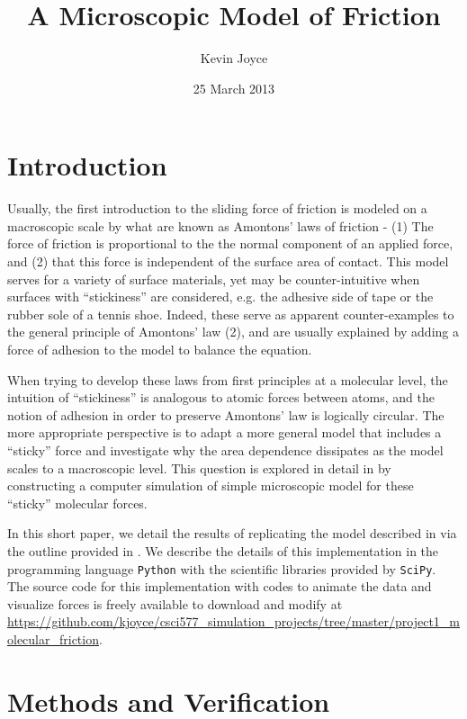 \documentclass[12pt]{amsart}
\title{A Microscopic Model of Friction}
\author{Kevin Joyce}
\date{25 March 2013}
\begin{document}
\maketitle
\section{Introduction}

Usually, the first introduction to the sliding force of friction is modeled on
a macroscopic scale by what are known as Amontons' laws of friction - (1) The
force of friction is proportional to the the normal component of an applied
force, and (2) that this force is independent of the surface area of
contact\cite{ringlein}.  This model serves for a variety of surface materials,
yet may be counter-intuitive when surfaces with ``stickiness'' are considered,
e.g. the adhesive side of tape or the rubber sole of a tennis shoe.  Indeed,
these serve as apparent counter-examples to the general principle of Amontons'
law (2), and are usually explained by adding a force of adhesion to the model
\cite{ringlein} to balance the equation.  

When trying to develop these laws from first principles at a molecular level,
the intuition of ``stickiness'' is analogous to atomic forces between atoms, and the
notion of adhesion in order to preserve Amontons' law is logically circular. 
The more appropriate perspective is to adapt a more general model that
includes a ``sticky'' force and investigate why the area dependence dissipates
as the model scales to a macroscopic level.  This question is explored in
detail in \cite{ringlein} by constructing a computer simulation of simple
microscopic model for these ``sticky'' molecular forces.

In this short paper, we detail the results of replicating the model described in
\cite{ringlein} via the outline provided in \cite{gould}.  We describe the
details of this implementation in the programming language \texttt{Python} with
the scientific libraries provided by \texttt{SciPy}.  The
source code for this implementation with codes to animate the data and
visualize forces is freely available to download and modify at
\url{https://github.com/kjoyce/csci577_simulation_projects/tree/master/project1_molecular_friction}.
   
\section{Methods and Verification} 
\end{document}
